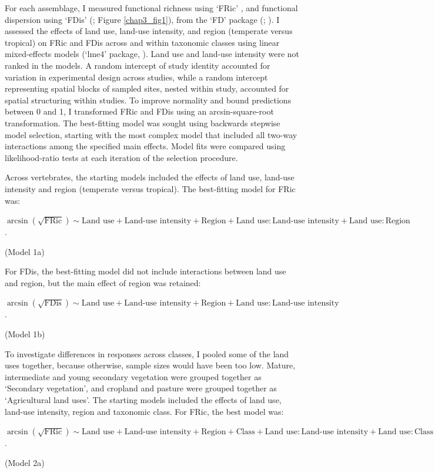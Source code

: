 For each assemblage, I measured functional richness using `FRic' \citep{Villeger2008}, and functional dispersion using `FDis’ (\citet{Laliberte2010}; Figure \ref{chap3_fig1}), from the `FD' package (\citet{Laliberte2010}; \citet{Laliberte2015}). I assessed the effects of land use, land-use intensity, and region (temperate versus tropical) on FRic and FDis across and within taxonomic classes using linear mixed-effects models (`lme4' package, \citet{Bates2015}). Land use and land-use intensity were not ranked in the models. A random intercept of study identity accounted for variation in experimental design across studies, while a random intercept representing spatial blocks of sampled sites, nested within study, accounted for spatial structuring within studies. To improve normality and bound predictions between 0 and 1, I transformed FRic and FDis using an arcsin-square-root transformation. The best-fitting model was sought using backwards stepwise model selection, starting with the most complex model that included all two-way interactions among the specified main effects. Model fits were compared using likelihood-ratio tests at each iteration of the selection procedure.

Across vertebrates, the starting models included the effects of land use, land-use intensity and region (temperate versus tropical). The best-fitting model for FRic was:
\begin{center}
$\arcsin(\sqrt{\text{FRic}})\sim \text{Land use} + \text{Land-use intensity} + \text{Region} + \text{Land use}:\text{Land-use intensity} + \text{Land use}:\text{Region}$.\\
\end{center}
\hspace*{\fill}(Model 1a)

For FDis, the best-fitting model did not include interactions between land use and region, but the main effect of region was retained:
\begin{center}
$\arcsin(\sqrt{\text{FDis}})\sim \text{Land use} + \text{Land-use intensity} + \text{Region} + \text{Land use}:\text{Land-use intensity}$.\\
\end{center}
\hspace*{\fill}(Model 1b)

To investigate differences in responses across classes, I pooled some of the land uses together, because otherwise, sample sizes would have been too low. Mature, intermediate and young secondary vegetation were grouped together as `Secondary vegetation', and cropland and pasture were grouped together as `Agricultural land uses'. The starting models included the effects of land use, land-use intensity, region and taxonomic class. For FRic, the best model was:
\begin{center}
$\arcsin(\sqrt{\text{FRic}})\sim \text{Land use} + \text{Land-use  intensity} + \text{Region} + \text{Class} + \text{Land use}:\text{Land-use intensity} + \text{Land use}:\text{Class} + \text{Land-use intensity}:\text{Region} + \text{Class}:\text{Region}$.\\
\end{center}
\hspace*{\fill}(Model 2a)

